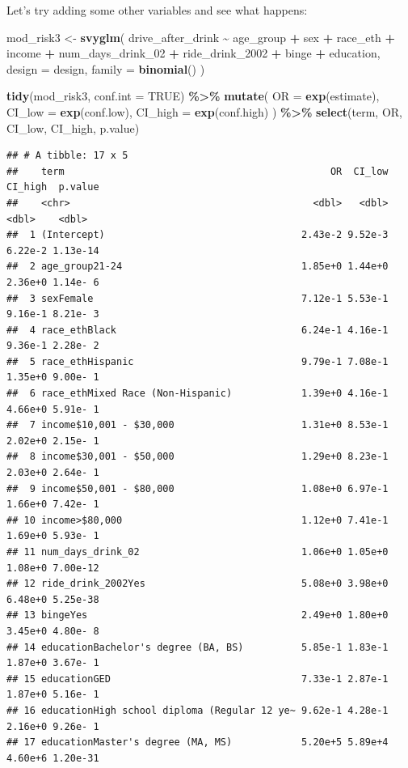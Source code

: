 \documentclass[
]{article}
\newenvironment{Shaded}{\begin{snugshade}}{\end{snugshade}}
\newcommand{\AttributeTok}[1]{\textcolor[rgb]{0.13,0.29,0.53}{#1}}
\newcommand{\ConstantTok}[1]{\textcolor[rgb]{0.56,0.35,0.01}{#1}}
\newcommand{\FunctionTok}[1]{\textcolor[rgb]{0.13,0.29,0.53}{\textbf{#1}}}
\newcommand{\NormalTok}[1]{#1}
\newcommand{\OtherTok}[1]{\textcolor[rgb]{0.56,0.35,0.01}{#1}}
\newcommand{\SpecialCharTok}[1]{\textcolor[rgb]{0.81,0.36,0.00}{\textbf{#1}}}
\begin{document}
Let's try adding some other variables and see what happens:

\begin{Shaded}
\begin{Highlighting}[]
\NormalTok{mod\_risk3 }\OtherTok{\textless{}{-}} \FunctionTok{svyglm}\NormalTok{(}
\NormalTok{  drive\_after\_drink }\SpecialCharTok{\textasciitilde{}}\NormalTok{ age\_group }\SpecialCharTok{+}\NormalTok{ sex }\SpecialCharTok{+}\NormalTok{ race\_eth }\SpecialCharTok{+}\NormalTok{ income }\SpecialCharTok{+} 
\NormalTok{     num\_days\_drink\_02 }\SpecialCharTok{+}\NormalTok{ ride\_drink\_2002 }\SpecialCharTok{+}\NormalTok{ binge }\SpecialCharTok{+}\NormalTok{ education,}
  \AttributeTok{design =}\NormalTok{ design,}
  \AttributeTok{family =} \FunctionTok{binomial}\NormalTok{()}
\NormalTok{) }

\FunctionTok{tidy}\NormalTok{(mod\_risk3, }\AttributeTok{conf.int =} \ConstantTok{TRUE}\NormalTok{) }\SpecialCharTok{\%\textgreater{}\%}
  \FunctionTok{mutate}\NormalTok{(}
    \AttributeTok{OR =} \FunctionTok{exp}\NormalTok{(estimate),}
    \AttributeTok{CI\_low =} \FunctionTok{exp}\NormalTok{(conf.low),}
    \AttributeTok{CI\_high =} \FunctionTok{exp}\NormalTok{(conf.high)}
\NormalTok{  ) }\SpecialCharTok{\%\textgreater{}\%}
  \FunctionTok{select}\NormalTok{(term, OR, CI\_low, CI\_high, p.value) }
\end{Highlighting}
\end{Shaded}

\begin{verbatim}
## # A tibble: 17 x 5
##    term                                              OR  CI_low CI_high  p.value
##    <chr>                                          <dbl>   <dbl>   <dbl>    <dbl>
##  1 (Intercept)                                  2.43e-2 9.52e-3 6.22e-2 1.13e-14
##  2 age_group21-24                               1.85e+0 1.44e+0 2.36e+0 1.14e- 6
##  3 sexFemale                                    7.12e-1 5.53e-1 9.16e-1 8.21e- 3
##  4 race_ethBlack                                6.24e-1 4.16e-1 9.36e-1 2.28e- 2
##  5 race_ethHispanic                             9.79e-1 7.08e-1 1.35e+0 9.00e- 1
##  6 race_ethMixed Race (Non-Hispanic)            1.39e+0 4.16e-1 4.66e+0 5.91e- 1
##  7 income$10,001 - $30,000                      1.31e+0 8.53e-1 2.02e+0 2.15e- 1
##  8 income$30,001 - $50,000                      1.29e+0 8.23e-1 2.03e+0 2.64e- 1
##  9 income$50,001 - $80,000                      1.08e+0 6.97e-1 1.66e+0 7.42e- 1
## 10 income>$80,000                               1.12e+0 7.41e-1 1.69e+0 5.93e- 1
## 11 num_days_drink_02                            1.06e+0 1.05e+0 1.08e+0 7.00e-12
## 12 ride_drink_2002Yes                           5.08e+0 3.98e+0 6.48e+0 5.25e-38
## 13 bingeYes                                     2.49e+0 1.80e+0 3.45e+0 4.80e- 8
## 14 educationBachelor's degree (BA, BS)          5.85e-1 1.83e-1 1.87e+0 3.67e- 1
## 15 educationGED                                 7.33e-1 2.87e-1 1.87e+0 5.16e- 1
## 16 educationHigh school diploma (Regular 12 ye~ 9.62e-1 4.28e-1 2.16e+0 9.26e- 1
## 17 educationMaster's degree (MA, MS)            5.20e+5 5.89e+4 4.60e+6 1.20e-31
\end{verbatim}
\end{document}
